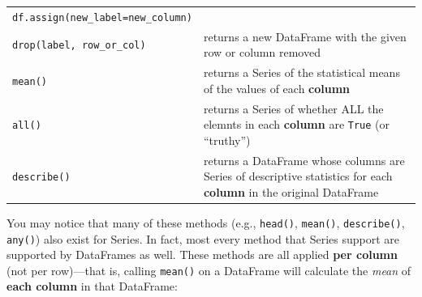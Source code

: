 \documentclass[]{book}
\begin{document}
\begin{longtable}[]{@{}ll@{}}
\begin{minipage}[t]{0.05\columnwidth}
\texttt{df.assign(new\_label=new\_column)}\strut
\end{minipage}\tabularnewline
\begin{minipage}[t]{0.05\columnwidth}\raggedright\strut
\texttt{drop(label,\ row\_or\_col)}\strut
\end{minipage} & \begin{minipage}[t]{0.05\columnwidth}\raggedright\strut
returns a new DataFrame with the given row or column removed\strut
\end{minipage}\tabularnewline
\begin{minipage}[t]{0.05\columnwidth}\raggedright\strut
\texttt{mean()}\strut
\end{minipage} & \begin{minipage}[t]{0.05\columnwidth}\raggedright\strut
returns a Series of the statistical means of the values of each
\textbf{column}\strut
\end{minipage}\tabularnewline
\begin{minipage}[t]{0.05\columnwidth}\raggedright\strut
\texttt{all()}\strut
\end{minipage} & \begin{minipage}[t]{0.05\columnwidth}\raggedright\strut
returns a Series of whether ALL the elemnts in each \textbf{column} are
\texttt{True} (or ``truthy'')\strut
\end{minipage}\tabularnewline
\begin{minipage}[t]{0.05\columnwidth}\raggedright\strut
\texttt{describe()}\strut
\end{minipage} & \begin{minipage}[t]{0.05\columnwidth}\raggedright\strut
returns a DataFrame whose columns are Series of descriptive statistics
for each \textbf{column} in the original DataFrame\strut
\end{minipage}\tabularnewline
\bottomrule
\end{longtable}

You may notice that many of these methods (e.g., \texttt{head()},
\texttt{mean()}, \texttt{describe()}, \texttt{any()}) also exist for
Series. In fact, most every method that Series support are supported by
DataFrames as well. These methods are all applied \textbf{per column}
(not per row)---that is, calling \texttt{mean()} on a DataFrame will
calculate the \emph{mean} of \textbf{each column} in that DataFrame:
\end{document}
